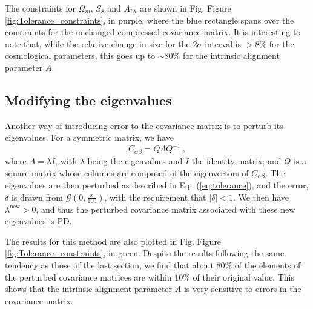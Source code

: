\documentclass[twocolumn]{\docclass}
\newcommand{\rf}[1]{Figure \ref{fig:#1}}
\newcommand{\ec}[1]{Eq.~(\ref{eq:#1})}
\newcommand\be{\begin{equation}}
\newcommand\ee{\end{equation}}
\begin{document}
	The constraints for $\Omega_m$, $S_8$ and $A_{\mathrm{IA}}$ are shown in Fig. \rf{Tolerance_constraints}, in purple, where the blue rectangle spans over the constraints for the unchanged compressed covariance matrix. It is interesting to note that, while the relative change in size for the $2\sigma$ interval is $> 8 \%$ for the cosmological parameters, this goes up to $\sim 80 \%$ for the intrinsic alignment parameter $A$.
	
	
	
	\subsection{Modifying the eigenvalues}
	
	Another way of introducing error to the covariance matrix is to perturb its eigenvalues. For a symmetric matrix, we have
	\be
	C_{\alpha \beta} = Q\Lambda Q^{-1}\ 
	,\ee
	where $\Lambda = \lambda I$, with $\lambda$ being the eigenvalues and $I$ the identity matrix; and $Q$ is a square matrix whose columns are composed of the eigenvectors of $C_{\alpha \beta}$. The eigenvalues are then perturbed as described in \ec{tolerance}, and the error, $\delta$ is drawn from $\mathcal{G}(0,\frac{x}{100})$, with the requirement that $|\delta| < 1$. We then have $\lambda^{\mathrm{new}} > 0$, and thus the perturbed covariance matrix associated with these new eigenvalues is PD. 
	
	The results for this method are also plotted in Fig. \rf{Tolerance_constraints}, in green. Despite the results following the same tendency as those of the last section, we find that about $80\%$ of the elements of the perturbed covariance matrices are within $10\%$ of their original value. This shows that the intrinsic alignment parameter $A$ is very sensitive to errors in the covariance matrix.
	
\end{document}
